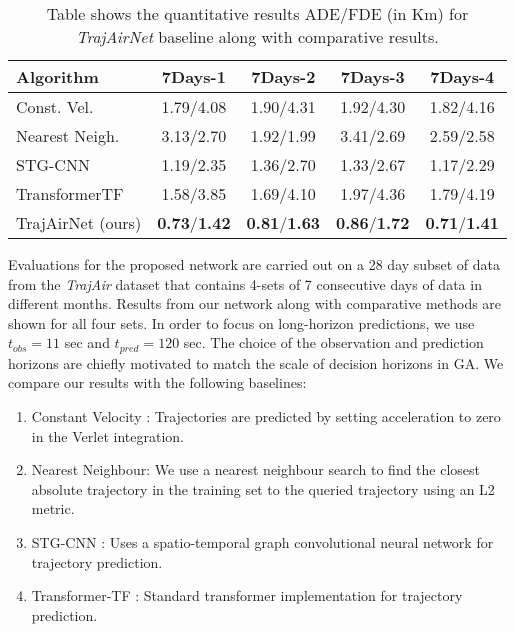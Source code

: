 \documentclass[letterpaper, 10 pt, conference]{ieeeconf}
\begin{document}
\begin{table}[!ht]
    \centering
    \begin{tabular}{|l|c|c|c|c|}
    \hline
    \textbf{Algorithm}  & \textbf{7Days-1} & \textbf{7Days-2} & \textbf{7Days-3} & \textbf{7Days-4} \\
\hline 
    Const. Vel.\cite{salzmann2020trajectron++} & 1.79/4.08 & 1.90/4.31 & 1.92/4.30 & 1.82/4.16  \\
    
    Nearest Neigh. & 3.13/2.70 & 1.92/1.99 & 3.41/2.69 & 2.59/2.58   \\
    
    STG-CNN\cite{mohamed2020social} & 1.19/2.35 & 1.36/2.70 & 1.33/2.67 & 1.17/2.29   \\
    TransformerTF\cite{giuliari2021transformer} & 1.58/3.85 & 1.69/4.10  &  1.97/4.36 &  1.79/4.19  \\
    \hline
    TrajAirNet (ours) & \textbf{0.73}/\textbf{1.42} & \textbf{0.81}/\textbf{1.63}&\textbf{0.86}/\textbf{1.72} & \textbf{0.71}/\textbf{1.41} \\  
    \hline
    \end{tabular}
    \caption{Table shows the quantitative results ADE/FDE (in Km) for \textit{TrajAirNet} baseline along with comparative results.}
    \label{tab:results}
\end{table}
Evaluations for the proposed network are carried out on a 28 day subset of data from the \textit{TrajAir} dataset that contains 4-sets of 7 consecutive days of data in different months. Results from our network along with comparative methods are shown for all four sets. In order to focus on long-horizon predictions, we use $t_{obs} = 11$ sec and $t_{pred} = 120 $ sec. The choice of the observation and prediction horizons are chiefly motivated to match the scale of decision horizons in GA.  
We compare our results with the following baselines:
\begin{enumerate}
    \item Constant Velocity \cite{salzmann2020trajectron++}: Trajectories are predicted by setting acceleration to zero in the Verlet integration.
    \item Nearest Neighbour: We use a nearest neighbour search to find the closest absolute trajectory in the training set to the queried trajectory using an L2 metric. 
    \item STG-CNN \cite{mohamed2020social}: Uses a spatio-temporal graph convolutional neural network for trajectory prediction.  
    \item Transformer-TF  \cite{giuliari2021transformer}: Standard transformer implementation for trajectory prediction.  
\end{enumerate}
\end{document}
